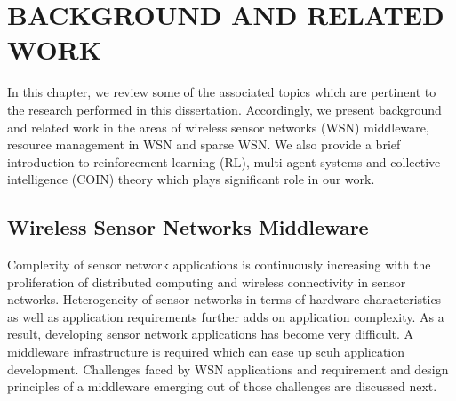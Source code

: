 \chapter{BACKGROUND AND RELATED WORK}

In this chapter, we review some of the
associated topics which are pertinent to the
research performed in this dissertation.
Accordingly, we present background and related
work in the areas of wireless sensor networks
(WSN) middleware, resource management in WSN and
sparse WSN. We also provide a brief introduction
to reinforcement learning (RL), multi-agent
systems and collective intelligence (COIN)
theory which plays significant role in our work. 

\section{Wireless Sensor Networks Middleware}

Complexity of sensor network applications is
continuously increasing with the proliferation of
distributed computing and wireless connectivity
in sensor networks. Heterogeneity of sensor
networks in terms of hardware characteristics as
well as application requirements further adds on
application complexity. As a result, developing
sensor network applications has become very
difficult. A middleware infrastructure is
required which can ease up scuh application
development. Challenges faced by WSN applications
and requirement and design principles of a
middleware emerging out of those challenges are
discussed next.


